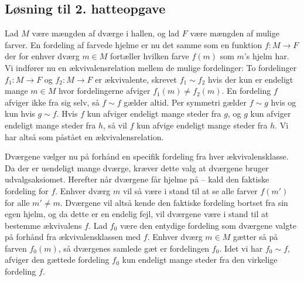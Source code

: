 \begin{minipage}[t]{100mm}
\subsection*{Løsning til 2. hatteopgave}
Lad $M$ være mængden af dværge i hallen, og lad $F$ være mængden af mulige farver. En fordeling af farvede hjelme er nu det samme som en funktion $f\colon M\to F$ der for enhver dværg $m\in M$ fortæller hvilken farve $f(m)$ som $m$'s hjelm har. Vi indfører nu en ækvivalensrelation mellem de mulige fordelinger: To fordelinger $f_1\colon M\to F$ og $f_2\colon M\to F$ er ækvivalente, skrevet $f_1\sim f_2$ hvis der kun er endeligt mange $m\in M$ hvor fordelingerne afviger $f_1(m)\neq f_2(m)$.
En fordeling $f$ afviger ikke fra sig selv, så $f\sim f$ gælder altid. Per symmetri gælder $f\sim g$ hvis og kun hvis $g\sim f$. Hvis $f$ kun afviger endeligt mange steder fra $g$, og $g$ kun afviger endeligt mange steder fra $h$, så vil $f$ kun afvige endeligt mange steder fra $h$. Vi har altså som påstået en ækvivalensrelation.

Dværgene vælger nu på forhånd en specifik fordeling fra hver ækvivalensklasse. Da der er uendeligt mange dværge, kræver dette valg at dværgene bruger udvalgsaksiomet.
Herefter når dværgene får hjelme på -- kald den faktiske fordeling for $f$. Enhver dværg $m$ vil så være i stand til at se alle farver $f(m')$ for alle $m'\neq m$. Dværgene vil altså kende den faktiske fordeling bortset fra sin egen hjelm, og da dette er en endelig fejl, vil dværgene være i stand til at bestemme ækvivalens $f$. Lad $f_0$ være den entydige fordeling som dværgene valgte på forhånd fra ækvivalensklassen med $f$. Enhver dværg $m\in M$ gætter så på farven $f_0(m)$, så dværgenes samlede gæt er fordelingen $f_0$. Idet vi har $f_0\sim f$, afviger den gættede fordeling $f_0$ kun endeligt mange steder fra den virkelige fordeling $f$.


\end{minipage}
